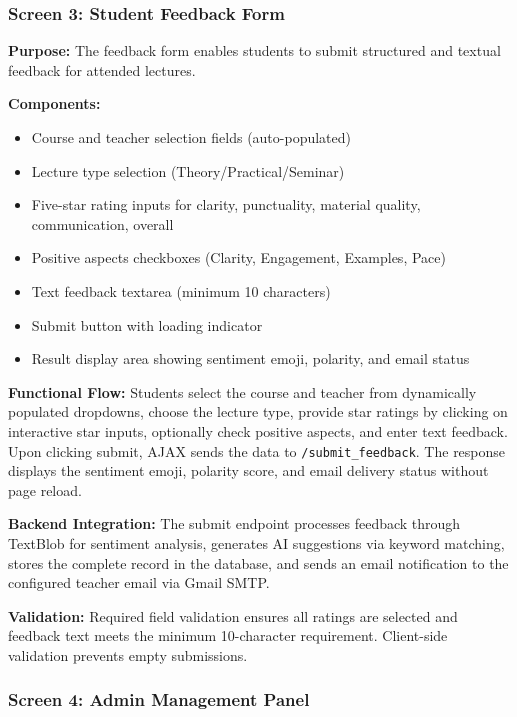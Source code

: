 
\subsubsection{Screen 3: Student Feedback Form}

\textbf{Purpose:}
The feedback form enables students to submit structured and textual feedback for attended lectures.

\textbf{Components:}
\begin{itemize}
    \item Course and teacher selection fields (auto-populated)
    \item Lecture type selection (Theory/Practical/Seminar)
    \item Five-star rating inputs for clarity, punctuality, material quality, communication, overall
    \item Positive aspects checkboxes (Clarity, Engagement, Examples, Pace)
    \item Text feedback textarea (minimum 10 characters)
    \item Submit button with loading indicator
    \item Result display area showing sentiment emoji, polarity, and email status
\end{itemize}

\textbf{Functional Flow:}
Students select the course and teacher from dynamically populated dropdowns, choose the lecture type, provide star ratings by clicking on interactive star inputs, optionally check positive aspects, and enter text feedback. Upon clicking submit, AJAX sends the data to \texttt{/submit\_feedback}. The response displays the sentiment emoji, polarity score, and email delivery status without page reload.

\textbf{Backend Integration:}
The submit endpoint processes feedback through TextBlob for sentiment analysis, generates AI suggestions via keyword matching, stores the complete record in the database, and sends an email notification to the configured teacher email via Gmail SMTP.

\textbf{Validation:}
Required field validation ensures all ratings are selected and feedback text meets the minimum 10-character requirement. Client-side validation prevents empty submissions.



\subsubsection{Screen 4: Admin Management Panel}

